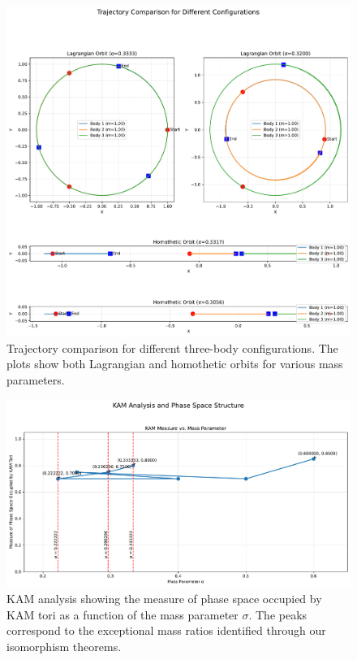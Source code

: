 \begin{figure}[htbp]
  \centering
  \includegraphics[width=\textwidth]{trajectory_comparison.pdf}
  \caption{Trajectory comparison for different three-body configurations. The plots show both Lagrangian and homothetic orbits for various mass parameters.}
  \label{fig:trajectory_comparison}
\end{figure}

\begin{figure}[htbp]
  \centering
  \includegraphics[width=\textwidth]{kam_analysis.pdf}
  \caption{KAM analysis showing the measure of phase space occupied by KAM tori as a function of the mass parameter $\sigma$. The peaks correspond to the exceptional mass ratios identified through our isomorphism theorems.}
  \label{fig:kam_analysis}
\end{figure}

